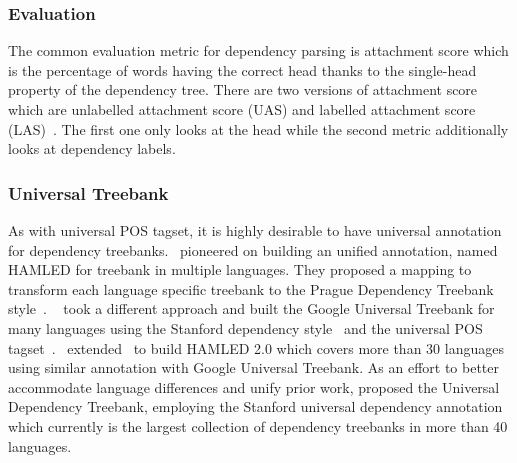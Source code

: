 \documentclass[12pt,twoside,final,hidelinks]{ltthesis}
\theoremstyle{definition}
\begin{document}
\subsubsection{Evaluation}
The common evaluation metric for dependency parsing is attachment score which is the percentage of words having the correct head thanks to the single-head property of the dependency tree. There are two versions of attachment score which are unlabelled attachment score (UAS) and labelled attachment score (LAS)~\cite{kubler2009dependency}. The first one only looks at the head while the second metric additionally looks at dependency labels. 

\subsubsection{Universal Treebank}
As with universal POS tagset, it is highly desirable to have universal annotation for 
dependency treebanks.~ pioneered on building an unified 
annotation, named HAMLED for treebank in multiple languages. They proposed a mapping to transform 
each language specific treebank to the Prague Dependency Treebank 
style~\cite{bohmovahhh:2001}. 
~ took a different approach and built the Google 
Universal Treebank for many languages using the Stanford dependency 
style~\cite{deMarneffe:2008:STD:1608858.1608859} and the universal POS 
tagset~\cite{UniversalTagSet}.~ 
extended~ to build HAMLED 2.0 which covers more than 30 
languages using similar annotation with Google Universal Treebank. 
As an effort to better accommodate language differences and unify prior work, 
 proposed the Universal Dependency Treebank, employing the Stanford 
universal dependency annotation~\cite{DBLP:conf/lrec/MarneffeDSHGNM14} which currently is the 
largest collection of dependency treebanks in more than 40 languages. 
\end{document}
